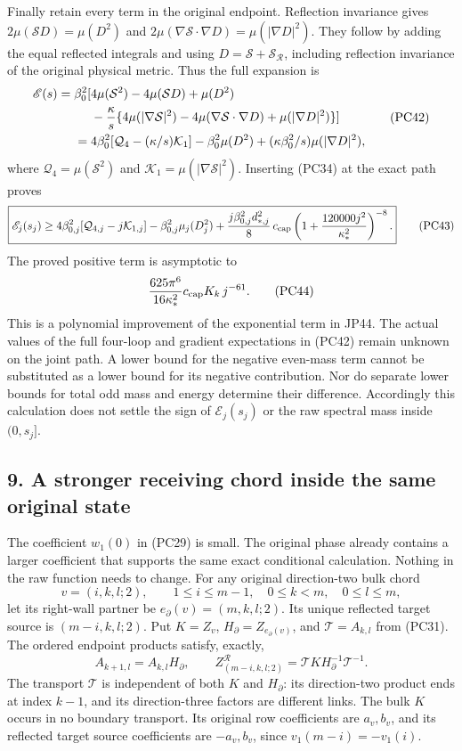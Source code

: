 \documentclass[11pt]{article}
\begin{document}
Finally retain every term in the original endpoint. Reflection
invariance gives
\(2\mu(\mathcal SD)=\mu(D^2)\) and
\(2\mu(\nabla\mathcal S\cdot\nabla D)=\mu(|\nabla D|^2)\).
They follow by adding the equal reflected integrals and using
\(D=\mathcal S+\mathcal S_{\mathcal R}\), including reflection
invariance of the original physical metric. Thus the full expansion is
\[
 \begin{aligned}
 \mathscr E(s)
 =\beta_0^2[&
 4\mu(\mathcal S^2)-4\mu(\mathcal SD)+\mu(D^2)\\
 &-{\kappa\over s}
   \{4\mu(|\nabla\mathcal S|^2)
      -4\mu(\nabla\mathcal S\cdot\nabla D)+\mu(|\nabla D|^2)\}]\\
 ={}&4\beta_0^2[\mathcal Q_4-(\kappa/s)\mathcal K_1]
                 -\beta_0^2\mu(D^2)
                 +(\kappa\beta_0^2/s)\mu(|\nabla D|^2),
 \end{aligned}\tag{PC42}
\]
where \(\mathcal Q_4=\mu(\mathcal S^2)\) and
\(\mathcal K_1=\mu(|\nabla\mathcal S|^2)\).
Inserting (PC34) at the exact path proves
\[
 \boxed{\displaystyle
 \mathscr E_j(s_j)\ge
 4\beta_{0,j}^2[\mathcal Q_{4,j}-j\mathcal K_{1,j}]
 -\beta_{0,j}^2\mu_j(D_j^2)
 +{j\beta_{0,j}^2d_{*,j}^2\over8}\,
       c_{\rm cap}\left(1+{120000j^2\over\kappa_*^2}\right)^{-8}.}
 \tag{PC43}
\]
The proved positive term is asymptotic to
\[
 {625\pi^6\over16\kappa_*^2}c_{\rm cap}K_k\,j^{-61}.
 \tag{PC44}
\]
This is a polynomial improvement of the exponential term in JP44.
The actual values of the full four-loop and gradient expectations
in (PC42) remain unknown on the joint path. A lower bound for the
negative even-mass term cannot be substituted as a lower bound for
its negative contribution. Nor do separate lower bounds for total
odd mass and energy determine their difference. Accordingly this
calculation does not settle the sign of \(\mathscr E_j(s_j)\) or
the raw spectral mass inside \((0,s_j]\).

\subsection*{9. A stronger receiving chord inside the same original state}

The coefficient \(w_1(0)\) in (PC29) is small. The original phase
already contains a larger coefficient that supports the same exact
conditional calculation. Nothing in the raw function needs to change.
For any original direction-two bulk chord
\[
 v=(i,k,l;2),\qquad 1\le i\le m-1,\quad
 0\le k<m,\quad0\le l\le m,
\]
let its right-wall partner be \(e_\partial(v)=(m,k,l;2)\).
Its unique reflected target source is \((m-i,k,l;2)\).
Put \(K=Z_v\), \(H_\partial=Z_{e_\partial(v)}\), and \(\mathcal T=A_{k,l}\)
from (PC31). The ordered endpoint products satisfy, exactly,
\[
 A_{k+1,l}=A_{k,l}H_\partial,\qquad
 Z^{\mathcal R}_{(m-i,k,l;2)}
       =\mathcal T K H_\partial^{-1}\mathcal T^{-1}.
 \tag{PC45}
\]
The transport \(\mathcal T\) is independent of both \(K\) and
\(H_\partial\): its direction-two product ends at index \(k-1\), and
its direction-three factors are different links. The bulk \(K\)
occurs in no boundary transport. Its original row coefficients
are \(a_v,b_v\), and its reflected target source coefficients are
\(-a_v,b_v\), since \(v_1(m-i)=-v_1(i)\).
\end{document}
